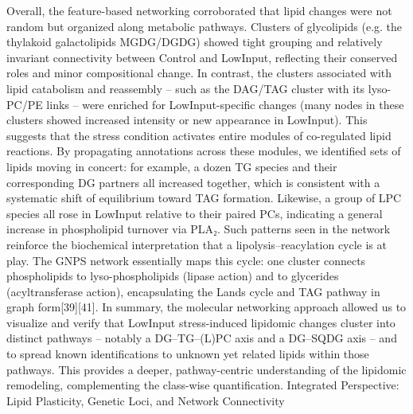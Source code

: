 \documentclass[10pt,letterpaper]{article}
\begin{document}
Overall, the feature-based networking corroborated that lipid changes were not random but organized along metabolic pathways. Clusters of glycolipids (e.g. the thylakoid galactolipids MGDG/DGDG) showed tight grouping and relatively invariant connectivity between Control and LowInput, reflecting their conserved roles and minor compositional change. In contrast, the clusters associated with lipid catabolism and reassembly – such as the DAG/TAG cluster with its lyso-PC/PE links – were enriched for LowInput-specific changes (many nodes in these clusters showed increased intensity or new appearance in LowInput). This suggests that the stress condition activates entire modules of co-regulated lipid reactions. By propagating annotations across these modules, we identified sets of lipids moving in concert: for example, a dozen TG species and their corresponding DG partners all increased together, which is consistent with a systematic shift of equilibrium toward TAG formation. Likewise, a group of LPC species all rose in LowInput relative to their paired PCs, indicating a general increase in phospholipid turnover via PLA₂. Such patterns seen in the network reinforce the biochemical interpretation that a lipolysis–reacylation cycle is at play. The GNPS network essentially maps this cycle: one cluster connects phospholipids to lyso-phospholipids (lipase action) and to glycerides (acyltransferase action), encapsulating the Lands cycle and TAG pathway in graph form[39][41]. In summary, the molecular networking approach allowed us to visualize and verify that LowInput stress-induced lipidomic changes cluster into distinct pathways – notably a DG–TG–(L)PC axis and a DG–SQDG axis – and to spread known identifications to unknown yet related lipids within those pathways. This provides a deeper, pathway-centric understanding of the lipidomic remodeling, complementing the class-wise quantification.
Integrated Perspective: Lipid Plasticity, Genetic Loci, and Network Connectivity
\end{document}
